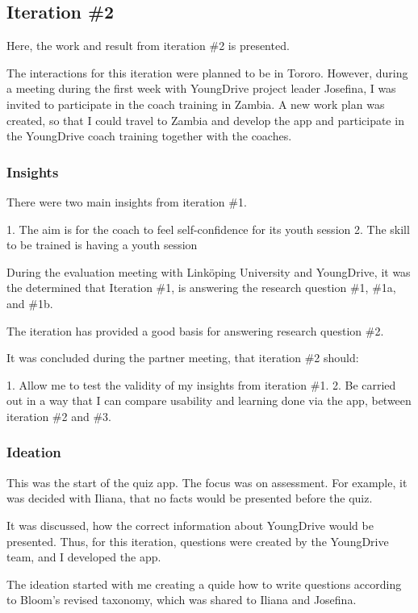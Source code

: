\subsection{Iteration \#2}
Here, the work and result from iteration \#2 is presented.

The interactions for this iteration were planned to be in Tororo. However, during a meeting during the first week with YoungDrive project leader Josefina, I was invited to participate in the coach training in Zambia. A new work plan was created, so that I could travel to Zambia and develop the app and participate in the YoungDrive coach training together with the coaches.

\subsubsection*{Insights}

There were two main insights from iteration \#1.

1. The aim is for the coach to feel self-confidence for its youth session
2. The skill to be trained is having a youth session

During the evaluation meeting with Linköping University and YoungDrive, it was the determined that Iteration \#1, is answering the research question \#1, \#1a, and \#1b.

The iteration has provided a good basis for answering research question \#2.

It was concluded during the partner meeting, that iteration \#2 should:

1. Allow me to test the validity of my insights from iteration \#1.
2. Be carried out in a way that I can compare usability and learning done via the app, between iteration \#2 and \#3.

\subsubsection*{Ideation}

This was the start of the quiz app. The focus was on assessment. For example, it was decided with Iliana, that no facts would be presented before the quiz.

It was discussed, how the correct information about YoungDrive would be presented. Thus, for this iteration, questions were created by the YoungDrive team, and I developed the app.

The ideation started with me creating a quide how to write questions according to Bloom's revised taxonomy, which was shared to Iliana and Josefina.


